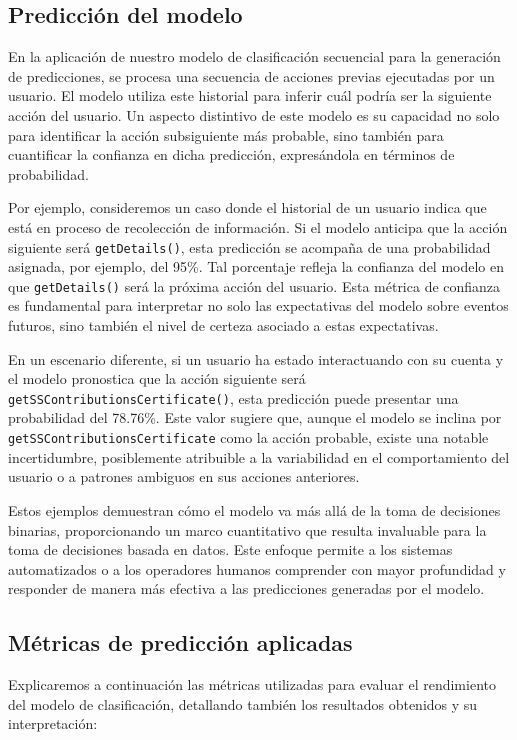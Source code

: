 \subsection{Predicción del modelo}

En la aplicación de nuestro modelo de clasificación secuencial para la generación de predicciones, se procesa una secuencia de acciones previas ejecutadas por un usuario. El modelo utiliza este historial para inferir cuál podría ser la siguiente acción del usuario. Un aspecto distintivo de este modelo es su capacidad no solo para identificar la acción subsiguiente más probable, sino también para cuantificar la confianza en dicha predicción, expresándola en términos de probabilidad.

Por ejemplo, consideremos un caso donde el historial de un usuario indica que está en proceso de recolección de información. Si el modelo anticipa que la acción siguiente será \texttt{getDetails()}, esta predicción se acompaña de una probabilidad asignada, por ejemplo, del 95\%. Tal porcentaje refleja la confianza del modelo en que \texttt{getDetails()} será la próxima acción del usuario. Esta métrica de confianza es fundamental para interpretar no solo las expectativas del modelo sobre eventos futuros, sino también el nivel de certeza asociado a estas expectativas.

En un escenario diferente, si un usuario ha estado interactuando con su cuenta y el modelo pronostica que la acción siguiente será \texttt{getSSContributionsCertificate()}, esta predicción puede presentar una probabilidad del 78.76\%. Este valor sugiere que, aunque el modelo se inclina por \texttt{getSSContributionsCertificate} como la acción probable, existe una notable incertidumbre, posiblemente atribuible a la variabilidad en el comportamiento del usuario o a patrones ambiguos en sus acciones anteriores.

Estos ejemplos demuestran cómo el modelo va más allá de la toma de decisiones binarias, proporcionando un marco cuantitativo que resulta invaluable para la toma de decisiones basada en datos. Este enfoque permite a los sistemas automatizados o a los operadores humanos comprender con mayor profundidad y responder de manera más efectiva a las predicciones generadas por el modelo.
\subsection{Métricas de predicción aplicadas}

Explicaremos a continuación las métricas utilizadas para evaluar el rendimiento del modelo de clasificación, detallando también los resultados obtenidos y su interpretación:

